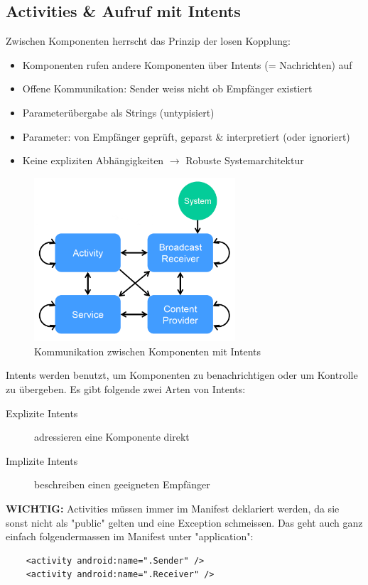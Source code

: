 \documentclass[a4paper]{article}
\begin{document}
	\subsection{Activities \& Aufruf mit Intents}
	Zwischen Komponenten herrscht das Prinzip der losen Kopplung:
	\begin{itemize}
		\item Komponenten rufen andere Komponenten über Intents (= Nachrichten) auf
		\item Offene Kommunikation: Sender weiss nicht ob Empfänger existiert
		\item Parameterübergabe als Strings (untypisiert)
		\item Parameter: von Empfänger geprüft, geparst \& interpretiert (oder ignoriert)
		\item Keine expliziten Abhängigkeiten $\rightarrow$ Robuste Systemarchitektur
	\end{itemize}
	\newpage
	\begin{figure}[htb!]
		\centering
		\includegraphics[width=7.5cm]{img/intents_comm.png}
		\caption{Kommunikation zwischen Komponenten mit Intents}
		\label{fig:intents_comm}	
	\end{figure}
	\noindent
	Intents werden benutzt, um Komponenten zu benachrichtigen oder um Kontrolle zu übergeben. Es gibt folgende zwei Arten von Intents:
	\begin{description}
		\item[Explizite Intents] adressieren eine Komponente direkt
		\item[Implizite Intents] beschreiben einen geeigneten Empfänger
	\end{description}
	\textbf{WICHTIG:} Activities müssen immer im Manifest deklariert werden, da sie sonst nicht als "public" gelten und eine Exception schmeissen. Das geht auch ganz einfach folgendermassen im Manifest unter "application":
	\begin{lstlisting}
	<activity android:name=".Sender" />
	<activity android:name=".Receiver" />
	\end{lstlisting}
	
\end{document}
